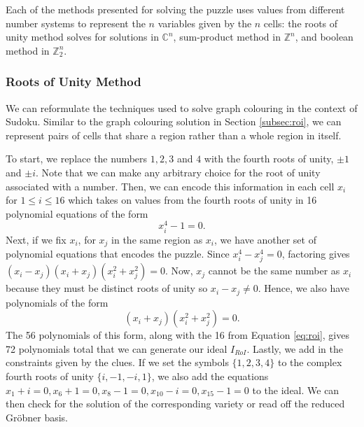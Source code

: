 \documentclass[../main.tex]{subfiles}
\begin{document}
            Each of the methods presented for solving the puzzle uses values from different number systems to represent the $n$ variables given by the $n$ cells: the roots of unity method solves for solutions in $\mathbb{C}^n$, sum-product method in $\mathbb{Z}^n$, and boolean method in $\mathbb{Z}_2^n$.

            \subsubsection{Roots of Unity Method}

            We can reformulate the techniques used to solve graph colouring in the context of Sudoku. Similar to the graph colouring solution in Section \ref{subsec:roi}, we can represent pairs of cells that share a region rather than a whole region in itself.
            
            To start, we replace the numbers $1,2,3$ and $4$ with the fourth roots of unity, $\pm 1$ and $\pm i$. Note that we can make any arbitrary choice for the root of unity associated with a number. Then, we can encode this information in each cell $x_i$ for $1\leq i\leq 16$ which takes on values from the fourth roots of unity in 16 polynomial equations of the form
            \begin{equation} 
                \label{eq:roi}
                x_i^4-1=0.
            \end{equation}
            Next, if we fix $x_i$, for $x_j$ in the same region as $x_i$, we have another set of polynomial equations that encodes the puzzle. Since $x_i^4-x_j^4=0$, factoring gives $(x_i-x_j)(x_i+x_j)(x_i^2+x_j^2)=0$. Now, $x_j$ cannot be the same number as $x_i$ because they must be distinct roots of unity so $x_i-x_j\neq0$. Hence, we also have polynomials of the form
            \begin{equation}
                \label{eq:roi factor}
                (x_i+x_j)(x_i^2+x_j^2)=0.
            \end{equation}
            The 56 polynomials of this form, along with the 16 from Equation \ref{eq:roi}, gives 72 polynomials total that we can generate our ideal $I_{RoI}$. Lastly, we add in the constraints given by the clues. If we set the symbols $\{1,2,3,4\}$ to the complex fourth roots of unity $\{i,-1,-i,1\}$, we also add the equations $x_1+i=0, x_6+1=0, x_8-1=0, x_{10} -i = 0, x_{15}-1=0$ to the ideal. We can then check for the solution of the corresponding variety or read off the reduced Gr\"obner basis.
\end{document}
